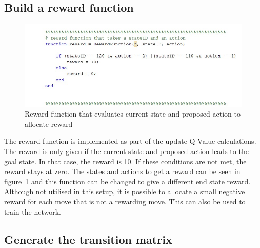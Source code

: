 \documentclass [11pt]{article}
\begin{document}
\subsection{Build a reward function}

\begin{figure}[H]
\centerline{\includegraphics[width=15cm]{reward_function}}
\caption{Reward function that evaluates current state and proposed action to allocate reward}
\label{fig:reward_function}
\end{figure}

The reward function is implemented as part of the update Q-Value calculations. The reward is only given if the current state and proposed action leads to the goal state. In that case, the reward is 10. If these conditions are not met, the reward stays at zero. The states and actions to get a reward can be seen in figure~\ref{fig:reward_function} and this function can be changed to give a different end state reward. Although not utilised in this setup, it is possible to allocate a small negative reward for each move that is not a rewarding move. This can also be used to train the network. 

\subsection{Generate the transition matrix}
\end{document}
